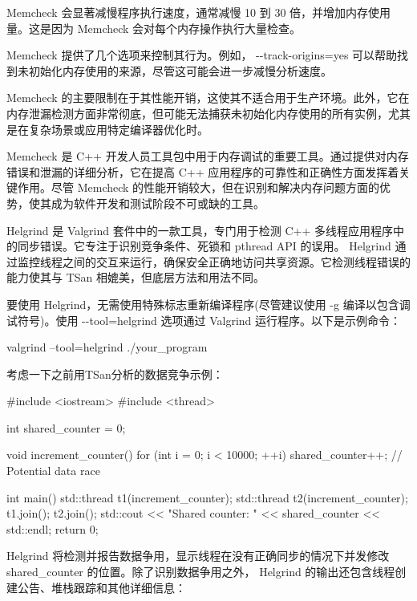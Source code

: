 Memcheck 会显著减慢程序执行速度，通常减慢 10 到 30 倍，并增加内存使用量。这是因为 Memcheck 会对每个内存操作执行大量检查。

Memcheck 提供了几个选项来控制其行为。例如， -{}-track-origins=yes 可以帮助找到未初始化内存使用的来源，尽管这可能会进一步减慢分析速度。

Memcheck 的主要限制在于其性能开销，这使其不适合用于生产环境。此外，它在内存泄漏检测方面非常彻底，但可能无法捕获未初始化内存使用的所有实例，尤其是在复杂场景或应用特定编译器优化时。

Memcheck 是 C++ 开发人员工具包中用于内存调试的重要工具。通过提供对内存错误和泄漏的详细分析，它在提高 C++ 应用程序的可靠性和正确性方面发挥着关键作用。尽管 Memcheck 的性能开销较大，但在识别和解决内存问题方面的优势，使其成为软件开发和测试阶段不可或缺的工具。


Helgrind 是 Valgrind 套件中的一款工具，专门用于检测 C++ 多线程应用程序中的同步错误。它专注于识别竞争条件、死锁和 pthread API 的误用。 Helgrind 通过监控线程之间的交互来运行，确保安全正确地访问共享资源。它检测线程错误的能力使其与 TSan 相媲美，但底层方法和用法不同。

要使用 Helgrind，无需使用特殊标志重新编译程序(尽管建议使用 -g 编译以包含调试符号)。使用 -{}-tool=helgrind 选项通过 Valgrind 运行程序。以下是示例命令：

\begin{shell}
valgrind --tool=helgrind ./your_program
\end{shell}

考虑一下之前用TSan分析的数据竞争示例：

\begin{cpp}
#include <iostream>
#include <thread>

int shared_counter = 0;

void increment_counter() {
    for (int i = 0; i < 10000; ++i) {
        shared_counter++; // Potential data race
    }
}

int main() {
    std::thread t1(increment_counter);
    std::thread t2(increment_counter);
    t1.join();
    t2.join();
    std::cout << "Shared counter: " << shared_counter << std::endl;
    return 0;
}
\end{cpp}

Helgrind 将检测并报告数据争用，显示线程在没有正确同步的情况下并发修改 shared\_counter 的位置。除了识别数据争用之外， Helgrind 的输出还包含线程创建公告、堆栈跟踪和其他详细信息：

